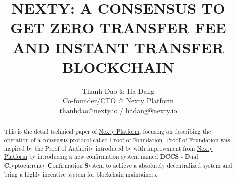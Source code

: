 \documentclass[12pt,oneside]{amsart}
\title{NEXTY: A CONSENSUS TO GET ZERO TRANSFER FEE AND INSTANT TRANSFER BLOCKCHAIN}
\author{
	Thanh Dao \& Ha Dang \\
	Co-founder/CTO @ Nexty Platform \\
	thanhdao@nexty.io / hadang@nexty.io
}
\date{} %
\begin{document}
\pagecolor{pagecolor}
\begin{abstract}
This is the detail technical paper of \href{https://nexty.io}{Nexty Platform}, focusing on describing the operation of a consensus protocol called Proof of Foundation. Proof of Foundation was inspired by the Proof of Authority introduced by \cite{clique} with improvement from \href{https://nexty.io}{Nexty Platform} by introducing a new confirmation system named \textbf{DCCS} - \textbf{D}ual \textbf{C}ryptocurrency \textbf{C}onfirmation \textbf{S}ystem to achieve a absolutely decentralized system and bring a highly incentive system for blockchain maintainers.
\end{abstract}

\maketitle
\end{document}
